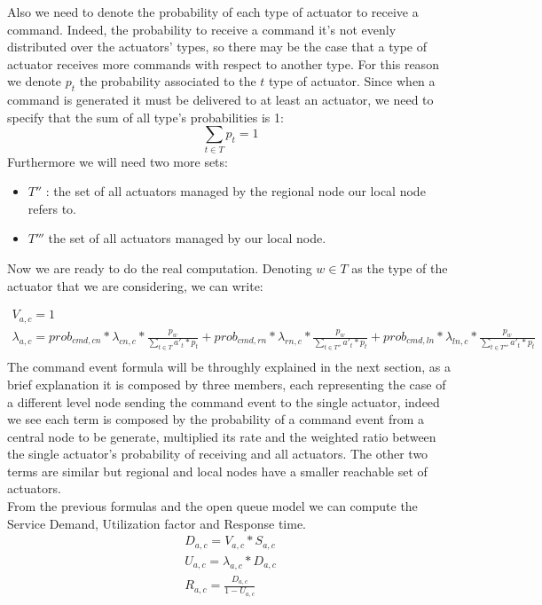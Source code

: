 \documentclass[11pt]{article}
\begin{document}
Also we need to denote the probability of each type of actuator to receive a command. Indeed, the probability to receive a command it's not evenly distributed over the actuators' types, so there may be the case that a type of actuator receives more commands with respect to another type.
For this reason we denote $p_t$ the probability associated to the $t$ type of actuator.
Since when a command is generated it must be delivered to at least an actuator, we need to specify that the sum of all type's probabilities is 1:
\begin{equation}
    \sum_{t \in T}{p_t} = 1
\end{equation}
Furthermore we will need two more sets:
\begin{itemize}
\item $T''$ : the set of all actuators managed by the regional node our local node refers to.
\item $T'''$ the set of all actuators managed by our local node.
\end{itemize}
Now we are ready to do the real computation. Denoting $w \in T$ as the type of the actuator that we are considering, we can write:

\begin{equation}
	\begin{array}{l}
		V_{a,c} = 1 \\

		\lambda_{a, c} = prob_{cmd,cn} * \lambda_{cn, c} * \frac{p_{w}}{\sum\limits_{t \in T}{a'_{t} * p_{t}}} + prob_{cmd,rn} * \lambda_{rn, c} *\frac{p_{w}}{\sum\limits_{t \in T''}{a'_{t} * p_{t}}} + prob_{cmd,ln} * \lambda_{ln, c} * \frac{p_{w}}{\sum\limits_{t \in T'''}{a'_{t} * p_{t}}}   \\
	\end{array}
\end{equation}
The command event formula will be throughly explained in the next section, as a brief explanation it is composed by three members, each representing the case of a different level node sending the command event to the single actuator, indeed we see each term is composed by the probability of a command event from a central node to be generate, multiplied its rate and the weighted ratio between the single actuator's probability of receiving and all actuators. The other two terms are similar but regional and local nodes have a smaller reachable set of actuators.\\
From the previous formulas and the open queue model we can compute the Service Demand, Utilization factor and Response time.
\begin{equation}
	\begin{array}{l}
		D_{a, c} = V_{a, c} * S_{a, c} \\
		U_{a, c} = \lambda_{a, c} * D_{a, c} \\
		R_{a, c} = \frac{D_{a, c}}{1 - U_{a,c}} \\
	\end{array}
\end{equation}
\end{document}
